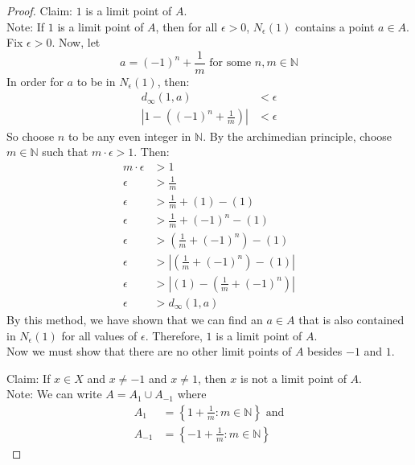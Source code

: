 \documentclass{amsart}
\begin{document}
\begin{enumerate}[1.]
\begin{proof}
Claim: $1$ is a limit point of $A$. \\
Note: If $1$ is a limit point of $A$, then for all $\epsilon > 0$,
$N_\epsilon(1)$ contains a point $a \in A$. \\
Fix $\epsilon > 0$. Now, let
\[
    a = (-1)^n + \frac{1}{m} \text{ for some } n,m \in \mathbb{N}  
\]
In order for $a$ to be in $N_\epsilon(1)$, then:
\begin{align*}
    d_\infty(1,a) &< \epsilon \\
    \left| 1 - \left( (-1)^n + \frac{1}{m} \right) \right| &< \epsilon
\end{align*}
So choose $n$ to be any even integer in $\mathbb{N}$. By the archimedian principle,
choose $m \in \mathbb{N}$ such that $m\cdot \epsilon > 1$. Then:
\begin{align*}
    m\cdot\epsilon &> 1 \\
    \epsilon &> \frac{1}{m} \\
    \epsilon &> \frac{1}{m} + (1) - (1) \\
    \epsilon &> \frac{1}{m} + (-1)^n - (1) \\
    \epsilon &> \left( \frac{1}{m} + (-1)^n \right) - (1) \\
    \epsilon &> \left| \left( \frac{1}{m} + (-1)^n \right) - (1) \right| \\
    \epsilon &> \left| (1) - \left( \frac{1}{m} + (-1)^n \right) \right| \\
    \epsilon &> d_\infty(1, a)
\end{align*}
By this method, we have shown that we can find an $a \in A$ that 
is also contained in $N_\epsilon(1)$ for all values of $\epsilon$.
Therefore, $1$ is a limit point of $A$. \\

Now we must show that there are no other limit points of $A$ besides
$-1$ and $1$.

Claim: If $x \in X$ and $x \neq -1$ and $x \neq 1$, then $x$ is not a limit point of $A$. \\

Note: We can write $A = A_1 \cup A_{-1}$ where 
\begin{align*}
    A_1 &= \left\{1+ \frac{1}{m}: m\in \mathbb{N}\right\} \text{ and} \\
    A_{-1} &= \left\{-1+ \frac{1}{m}: m\in \mathbb{N}\right\}
\end{align*}


\end{proof}
\end{enumerate}
\end{document}
